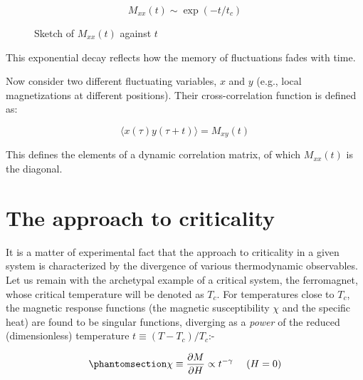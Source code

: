 \documentclass[
  letterpaper,
  enabledeprecatedfontcommands]{report}
\begin{document}
\[
M_{xx}(t) \sim \exp(-t / t_c)
\]

\begin{figure}


\caption{\label{fig-Mxx}Sketch of \(M_{xx}(t)\) against \(t\)}

\end{figure}%

This exponential decay reflects how the memory of fluctuations fades
with time.

Now consider two different fluctuating variables, \(x\) and \(y\) (e.g.,
local magnetizations at different positions). Their cross-correlation
function is defined as:

\[
\langle x(\tau) y(\tau + t) \rangle = M_{xy}(t)
\]

This defines the elements of a dynamic correlation matrix, of which
\(M_{xx}(t)\) is the diagonal.

\chapter{The approach to criticality}\label{sec:approach}

It is a matter of experimental fact that the approach to criticality in
a given system is characterized by the divergence of various
thermodynamic observables. Let us remain with the archetypal example of
a critical system, the ferromagnet, whose critical temperature will be
denoted as \(T_c\). For temperatures close to \(T_c\), the magnetic
response functions (the magnetic susceptibility \(\chi\) and the
specific heat) are found to be singular functions, diverging as a
\emph{power} of the reduced (dimensionless) temperature \(t \equiv
(T-T_c)/T_c\):-

\begin{equation}\phantomsection\label{eq-chipow}{
\chi \equiv \frac{\partial M}{\partial H}\propto t^{-\gamma} ~~~~ (H=0) 
}\end{equation}
\end{document}
